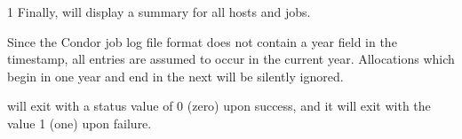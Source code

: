 \begin{ManPage}{\label{man-condor-userlog}}{1}
Finally,  will display a summary for all hosts and
jobs.

\begin{Options}
\end{Options}

\GenRem
Since the Condor job log file format does not contain a year field in
the timestamp, all entries are assumed to occur in the current year.
Allocations which begin in one year and end in the next will be
silently ignored.

\ExitStatus

 will exit with a status value of 0 (zero) upon success,
and it will exit with the value 1 (one) upon failure.

\end{ManPage}
